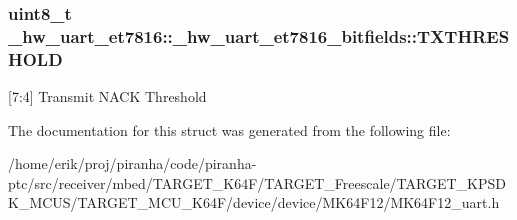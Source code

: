 \subsubsection[{\texorpdfstring{T\+X\+T\+H\+R\+E\+S\+H\+O\+LD}{TXTHRESHOLD}}]{\setlength{\rightskip}{0pt plus 5cm}uint8\+\_\+t \+\_\+hw\+\_\+uart\+\_\+et7816\+::\+\_\+hw\+\_\+uart\+\_\+et7816\+\_\+bitfields\+::\+T\+X\+T\+H\+R\+E\+S\+H\+O\+LD}\hypertarget{struct__hw__uart__et7816_1_1__hw__uart__et7816__bitfields_a35619d0e157807f6241c521d92865916}{}\label{struct__hw__uart__et7816_1_1__hw__uart__et7816__bitfields_a35619d0e157807f6241c521d92865916}
\mbox{[}7\+:4\mbox{]} Transmit N\+A\+CK Threshold 

The documentation for this struct was generated from the following file\+:\begin{DoxyCompactItemize}
\item 
/home/erik/proj/piranha/code/piranha-\/ptc/src/receiver/mbed/\+T\+A\+R\+G\+E\+T\+\_\+\+K64\+F/\+T\+A\+R\+G\+E\+T\+\_\+\+Freescale/\+T\+A\+R\+G\+E\+T\+\_\+\+K\+P\+S\+D\+K\+\_\+\+M\+C\+U\+S/\+T\+A\+R\+G\+E\+T\+\_\+\+M\+C\+U\+\_\+\+K64\+F/device/device/\+M\+K64\+F12/M\+K64\+F12\+\_\+uart.\+h\end{DoxyCompactItemize}
